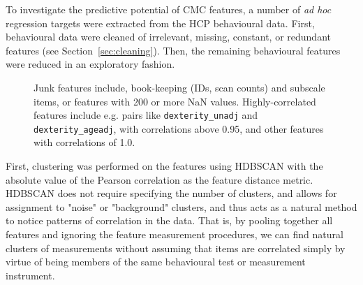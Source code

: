 \documentclass{article}
\begin{document}
To investigate the predictive potential of CMC features, a number of \emph{ad
hoc} regression targets were extracted from the HCP behavioural data.
First, behavioural data were cleaned of irrelevant, missing, constant, or
redundant features (see Section~\ref{sec:cleaning}). Then, the remaining
behavioural features were reduced in an exploratory fashion.

\begin{figure}
\centering
\footnotesize


\centering
\normalsize
\caption{Junk features include, book-keeping (IDs, scan counts) and subscale
items, or features with 200 or more NaN values. Highly-correlated features
include e.g\@. pairs like \texttt{dexterity\_unadj} and
\texttt{dexterity\_ageadj}, with correlations above 0.95, and other features
with correlations of 1.0.}
\end{figure}


First, clustering was performed on the features using HDBSCAN
\citep{campelloHierarchicalDensityEstimates2015,JMLR:v12:pedregosa11a} with
the absolute value of the Pearson correlation as the feature distance metric.
HDBSCAN does not require specifying the number of clusters, and allows for
assignment to "noise" or "background" clusters, and thus acts as a natural
method to notice patterns of correlation in the data. That is, by pooling
together all features and ignoring the feature measurement procedures, we can
find natural clusters of measurements without assuming that items are
correlated simply by virtue of being members of the same behavioural test or
measurement instrument.
\end{document}
